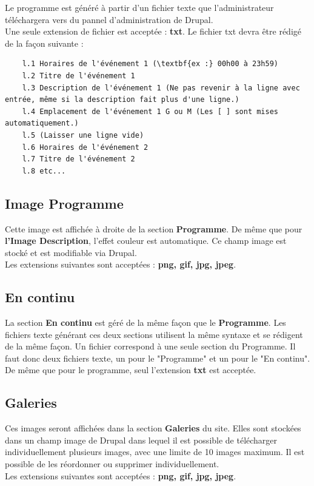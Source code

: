 \documentclass[11pt]{report}
\begin{document}
Le programme est généré à partir d'un fichier texte que l'administrateur
téléchargera vers du pannel d'administration de Drupal. \\
Une seule extension de fichier est acceptée : \textbf{txt}.
Le fichier txt devra être rédigé de la façon suivante :
\begin{verbatim}
	l.1 Horaires de l'événement 1 (\textbf{ex :} 00h00 à 23h59)
	l.2 Titre de l'événement 1
	l.3 Description de l'événement 1 (Ne pas revenir à la ligne avec entrée, même si la description fait plus d'une ligne.)
	l.4 Emplacement de l'événement 1 G ou M (Les [ ] sont mises automatiquement.)
	l.5 (Laisser une ligne vide)
	l.6 Horaires de l'événement 2
	l.7 Titre de l'événement 2
	l.8 etc...
\end{verbatim}

\subsection{Image Programme}

Cette image est affichée à droite de la section \textbf{Programme}. De même que
pour \textbf{l'Image Description}, l'effet couleur est automatique.
Ce champ image est stocké et est modifiable via Drupal. \\
Les extensions suivantes sont acceptées : \textbf{png, gif, jpg, jpeg}.

\subsection{En continu}

La section \textbf{En continu} est géré de la même façon que le \textbf{Programme}.
Les fichiers texte générant ces deux sections utilisent la même syntaxe et se
rédigent de la même façon. Un fichier correspond à une seule section du Programme.
Il faut donc deux fichiers texte, un pour le "Programme" et un pour le "En continu".
De même que pour le programme, seul l'extension \textbf{txt} est acceptée.

\subsection{Galeries}

Ces images seront affichées dans la section \textbf{Galeries} du site. Elles sont
stockées dans un champ image de Drupal dans lequel il est possible de télécharger
individuellement plusieurs images, avec une limite de 10 images maximum.
Il est possible de les réordonner ou supprimer individuellement. \\
Les extensions suivantes sont acceptées : \textbf{png, gif, jpg, jpeg}.
\end{document}
